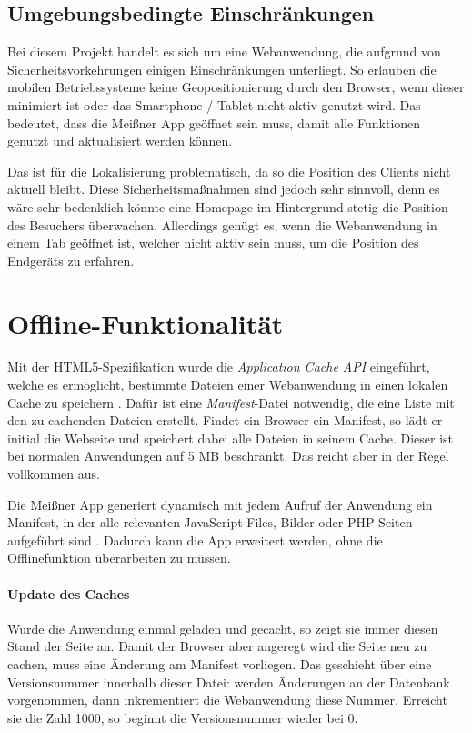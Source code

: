 \subsection{Umgebungsbedingte Einschränkungen}
Bei diesem Projekt handelt es sich um eine Webanwendung, die aufgrund von Sicherheitsvorkehrungen einigen Einschränkungen unterliegt. So erlauben die mobilen Betriebssysteme keine Geopositionierung durch den Browser, wenn dieser minimiert ist oder das Smartphone / Tablet nicht aktiv genutzt wird. Das bedeutet, dass die Meißner App geöffnet sein muss, damit alle Funktionen genutzt und aktualisiert werden können.\par

Das ist für die Lokalisierung problematisch, da so die Position des Clients nicht aktuell bleibt. Diese Sicherheitsmaßnahmen sind jedoch sehr sinnvoll, denn es wäre sehr bedenklich könnte eine Homepage im Hintergrund stetig die Position des Besuchers überwachen. Allerdings genügt es, wenn die Webanwendung in einem Tab geöffnet ist, welcher nicht aktiv sein muss, um die Position des Endgeräts zu erfahren.


\section{Offline-Funktionalität}
Mit der HTML5-Spezifikation wurde die \emph{Application Cache API} eingeführt, welche es ermöglicht, bestimmte Dateien einer Webanwendung in einen lokalen Cache zu speichern \cite[S. 189f]{friberg2013web}. Dafür ist eine \emph{Manifest}-Datei notwendig, die eine Liste mit den zu cachenden Dateien erstellt. Findet ein Browser ein Manifest, so lädt er initial die Webseite und speichert dabei alle Dateien in seinem Cache. Dieser ist bei normalen Anwendungen auf 5 MB beschränkt. Das reicht aber in der Regel vollkommen aus.\par

Die Meißner App generiert dynamisch mit jedem Aufruf der Anwendung ein Manifest, in der alle relevanten JavaScript Files, Bilder oder PHP-Seiten aufgeführt sind \cite{dynamic:manifest}. Dadurch kann die App erweitert werden, ohne die Offlinefunktion überarbeiten zu müssen.

\paragraph{Update des Caches}
Wurde die Anwendung einmal geladen und gecacht, so zeigt sie immer diesen Stand der Seite an. Damit der Browser aber angeregt wird die Seite neu zu cachen, muss eine Änderung am Manifest vorliegen. Das geschieht über eine Versionsnummer innerhalb dieser Datei: werden Änderungen an der Datenbank vorgenommen, dann inkrementiert die Webanwendung diese Nummer. Erreicht sie die Zahl 1000, so beginnt die Versionsnummer wieder bei 0.\par

